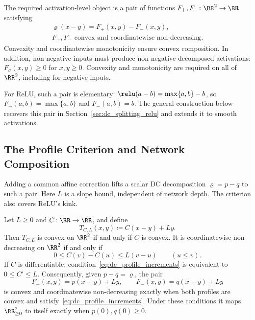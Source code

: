 The required activation-level object is a pair of functions $F_+,F_-\colon\RR^2\to\RR$ satisfying
\begin{equation}
    \begin{gathered}
    \varrho(x-y)=F_+(x,y)-F_-(x,y),\\
    F_+,F_-\text{ convex and coordinatewise non-decreasing}.
    \end{gathered}
    \label{eq:general_dc_pair}
\end{equation}
Convexity and coordinatewise monotonicity ensure convex composition. In addition, non-negative inputs must produce non-negative decomposed activations: $F_\sigma(x,y)\ge0$ for $x,y\ge0$. Convexity and monotonicity are required on all of $\RR^2$, including for negative inputs.

For ReLU, such a pair is elementary: $\relu(a-b)=\max\{a,b\}-b$, so $F_+(a,b)=\max\{a,b\}$ and $F_-(a,b)=b$. The general construction below recovers this pair in Section~\ref{sec:dc_splitting_relu} and extends it to smooth activations.

\subsection{The Profile Criterion and Network Composition}\label{sec:profile_criterion}

Adding a common affine correction lifts a scalar DC decomposition $\varrho=p-q$ to such a pair. Here $L$ is a slope bound, independent of network depth. The criterion also covers ReLU's kink.

\begin{proposition}\label{prop:dc_profile_lift}
Let $L\ge0$ and $C\colon\RR\to\RR$, and define
\begin{equation}
    T_{C,L}(x,y)\coloneqq C(x-y)+Ly.
    \label{eq:dc_profile_lift}
\end{equation}
Then $T_{C,L}$ is convex on $\RR^2$ if and only if $C$ is convex. It is coordinatewise non-decreasing on $\RR^2$ if and only if
\begin{equation}
    0\le C(v)-C(u)\le L(v-u)\qquad(u\le v).
    \label{eq:dc_profile_increments}
\end{equation}
If $C$ is differentiable, condition~\eqref{eq:dc_profile_increments} is equivalent to $0\le C'\le L$. Consequently, given $p-q=\varrho$, the pair
\begin{equation}
    F_+(x,y)=p(x-y)+Ly,
    \qquad F_-(x,y)=q(x-y)+Ly
    \label{eq:asymmetric_dc_pair}
\end{equation}
is convex and coordinatewise non-decreasing exactly when both profiles are convex and satisfy~\eqref{eq:dc_profile_increments}. Under these conditions it maps $\RR^2_{\ge0}$ to itself exactly when $p(0),q(0)\ge0$.
\end{proposition}

